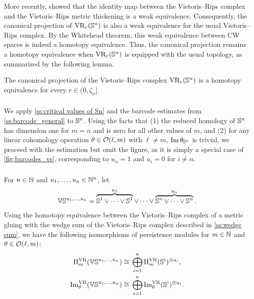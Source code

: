 More recently, \cite{gillespie2024vietoris} showed that the identity map between the Vietoris--Rips complex and the Vietoris--Rips metric thickening is a weak equivalence.
Consequently, the canonical projection of \(\mathrm{VR}_r(\mathbb{S}^n)\) is also a weak equivalence for the usual Vietoris--Rips complex. By the Whitehead theorem, this weak equivalence between CW spaces is indeed a homotopy equivalence.
Thus, the canonical projection remains a homotopy equivalence when \(\mathrm{VR}_r(\mathbb{S}^n)\) is equipped with the usual topology, as summarized by the following lemma.

\lemma
The canonical projection of the Vietoris--Rips complex \(\mathrm{VR}_r(\mathbb{S}^n)\) is a homotopy equivalence for every $r \in (0, \zeta_n]$.

\subsubsection{}\label{ss:barcode_Sn}

We apply \cref{ss:critical values of Sn} and the barcode estimates from \cref{ss:barcode_general} to \(\mathbb{S}^n\).
Using the facts that (1) the reduced homology of \(\mathbb{S}^n\) has dimension one for \(m = n\) and is zero for all other values of \(m\), and (2) for any linear cohomology operation \(\theta \in \mathcal{O}(\ell, m)\) with \(\ell \neq m\), \(\operatorname{Im} \theta_{\mathbb{S}^n}\) is trivial, we proceed with the estimation but omit the figure, as it is simply a special case of \cref{fig:barcodes_vs},
corresponding to $u_n=1$ and $u_i=0$ for $i\neq n$.

\subsubsection{}\label{ss:barcodes_VS}

For $n \in \mathbb{N}$ and $u_1, \dots, u_n \in \mathbb{N}^n$, let
\[
\mathbb{VS}^{u_1,\dots,u_n} =
\overbrace{\mathbb{S}^1\vee\dots\vee\mathbb{S}^1}^{u_1} \vee\dots\vee \overbrace{\mathbb{S}^n\vee\dots\vee\mathbb{S}^n}^{u_n}.
\]
Using the homotopy equivalence between the Vietoris--Rips complex of a metric gluing with the wedge sum of the Vietoris--Rips complex described in \cref{ss:wedge sum}, we have the following isomorphisms of persistence modules for \(m \in \mathbb{N}\) and \(\theta \in \mathcal{O}(\ell,m)\):
\[
\begin{split}
	\mathrm{H}_m^{\mathrm{VR}}(\mathbb{VS}^{u_1,\dots,u_n}) &\cong \, \bigoplus_{i=1}^n \mathrm{H}_m^{\mathrm{VR}}(\mathbb{S}^i)^{\oplus u_i}, \\
	\operatorname{Im}_\theta^{\mathrm{VR}}(\mathbb{VS}^{u_1,\dots,u_n}) &\cong \, \bigoplus_{i=1}^n \operatorname{Im}_\theta^{\mathrm{VR}}(\mathbb{S}^i)^{\oplus u_i}.
\end{split}
\]

